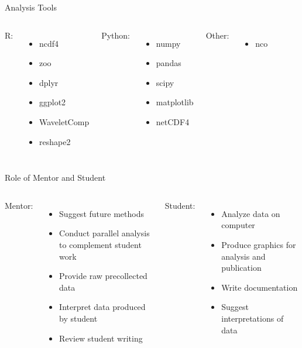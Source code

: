 \documentclass{beamer}
\begin{document}
\begin{frame}{Analysis Tools}
  \begin{columns}[t]
    R:
    \begin{itemize}
    \item ncdf4
    \item zoo
    \item dplyr
    \item ggplot2
    \item WaveletComp
    \item reshape2
    \end{itemize}
    Python:
    \begin{itemize}
    \item numpy
    \item pandas
    \item scipy
    \item matplotlib
    \item netCDF4
    \end{itemize}
    Other:
    \begin{itemize}
    \item nco
    \end{itemize}
  \end{columns}

\end{frame}

\begin{frame}{Role of Mentor and Student}
  \begin{columns}[t]
    Mentor:
    \begin{itemize}
    \item Suggest future methods
    \item Conduct parallel analysis to complement student work
    \item Provide raw precollected data
    \item Interpret data produced by student
    \item Review student writing
    \end{itemize}
    Student:
    \begin{itemize}
    \item Analyze data on computer
    \item Produce graphics for analysis and publication
    \item Write documentation
    \item Suggest interpretations of data
    \end{itemize}
  \end{columns}

\end{frame}
\end{document}
